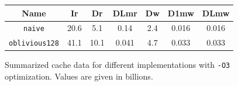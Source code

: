 \documentclass{scrartcl}
\begin{document}
    \begin{figure}[h!]
        \begin{center}
            \begin{tabular}{ | c | c | c | c | c | c | c |}
                \hline  
                Name                    & Ir    & Dr    & DLmr  & Dw    & D1mw  & DLmw \\
                \hline  
                \texttt{naive}          & 20.6  & 5.1   & 0.14  & 2.4   & 0.016 & 0.016\\ 
                \hline  
                \texttt{oblivious128}   & 41.1  & 10.1  & 0.041 & 4.7   & 0.033 & 0.033\\      
                \hline  
            \end{tabular}            
        \end{center}
        \caption{Summarized cache data for different implementations with \texttt{-O3} optimization. Values are given in billions.}
        \label{tab:cache_data}
    \end{figure}
\end{document}
